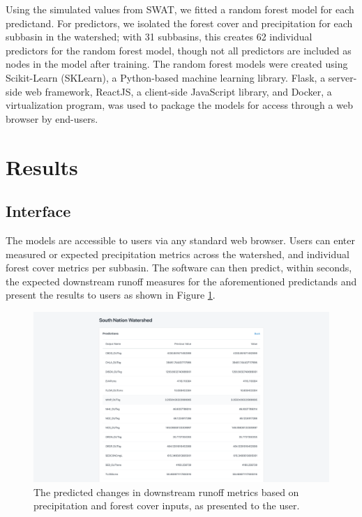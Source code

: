 \documentclass[runningheads]{llncs}
\begin{document}
Using the simulated values from SWAT, we fitted a random forest model for each predictand.
For predictors, we isolated the forest cover and precipitation for each subbasin in the watershed; with 31 subbasins, this creates 62 individual predictors for the random forest model, though not all predictors are included as nodes in the model after training.
The random forest models were created using Scikit-Learn (SKLearn), a Python-based machine learning library.
Flask, a server-side web framework, ReactJS, a client-side JavaScript library, and Docker, a virtualization program, was used to package the models for access through a web browser by end-users.

\section{Results}
\subsection{Interface}
The models are accessible to users via any standard web browser.
Users can enter measured or expected precipitation metrics across the watershed, and individual forest cover metrics per subbasin.
The software can then predict, within seconds, the expected downstream runoff measures for the aforementioned predictands and present the results to users as shown in Figure \ref{fig-web}.

\begin{figure}[h]
\begin{center}
%
  \includegraphics[width=\linewidth]{images/webpage.png}
\endminipage
\caption{The predicted changes in downstream runoff metrics based on precipitation and forest cover inputs, as presented to the user.} \label{fig-web}
\end{center}
\end{figure}
\end{document}
